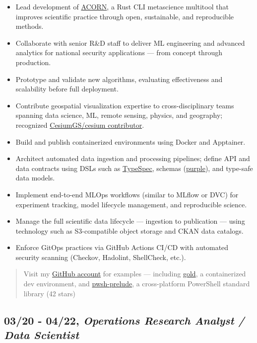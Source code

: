 \documentclass[10pt]{article}
\def\tightlist{}
\begin{document}
\begin{itemize}
\tightlist
\item
  Lead development of
  \href{https://code.ornl.gov/research-enablement/acorn}{ACORN}, a Rust
  CLI metascience multitool that improves scientific practice through
  open, sustainable, and reproducible methods.
\item
  Collaborate with senior R\&D staff to deliver ML engineering and
  advanced analytics for national security applications --- from concept
  through production.
\item
  Prototype and validate new algorithms, evaluating effectiveness and
  scalability before full deployment.
\item
  Contribute geospatial visualization expertise to cross-disciplinary
  teams spanning data science, ML, remote sensing, physics, and
  geography; recognized
  \href{https://github.com/CesiumGS/cesium/blob/main/CONTRIBUTORS.md}{CesiumGS/cesium
  contributor}.
\item
  Build and publish containerized environments using Docker and
  Apptainer.
\item
  Architect automated data ingestion and processing pipelines; define
  API and data contracts using DSLs such as
  \href{https://typespec.io/}{TypeSpec}, schemas
  (\href{https://github.com/jhwohlgemuth/purple}{purple}), and type-safe
  data models.
\item
  Implement end-to-end MLOps workflows (similar to MLflow or DVC) for
  experiment tracking, model lifecycle management, and reproducible
  science.
\item
  Manage the full scientific data lifecycle --- ingestion to publication
  --- using technology such as S3-compatible object storage and CKAN
  data catalogs.
\item
  Enforce GitOps practices via GitHub Actions CI/CD with automated
  security scanning (Checkov, Hadolint, ShellCheck, etc.).
\end{itemize}

\begin{quote}
Visit my \href{https://github.com/jhwohlgemuth}{GitHub account} for
examples --- including
\href{https://github.com/jhwohlgemuth/gold}{gold}, a containerized dev
environment, and
\href{https://github.com/jhwohlgemuth/pwsh-prelude}{pwsh-prelude}, a
cross-platform PowerShell standard library (42 stars)
\end{quote}

\subsection{\texorpdfstring{03/20 - 04/22, \textbf{\emph{Operations
Research Analyst / Data
Scientist}}}{03/20 - 04/22, Operations Research Analyst / Data Scientist}}\label{operations-research-analyst-data-scientist}
\end{document}
